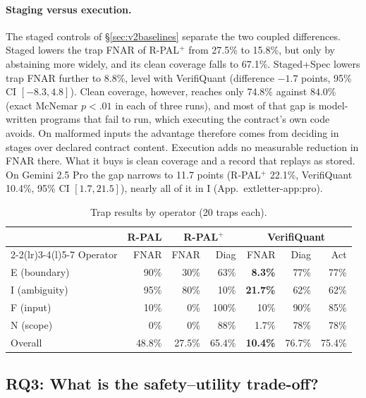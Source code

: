 \documentclass[sigconf]{acmart}
\newcommand{\govVQfnar}{10.4\%}           %
\newcommand{\govPromptFnar}{27.5\%}       %
\newcommand{\govPlainFnar}{48.8\%}        %
\newcommand{\govVQdiag}{76.7\%}
\newcommand{\govVQaction}{75.4\%}
\newcommand{\govPromptDiag}{65.4\%}
\newcommand{\stagedOneFnar}{15.8\%}     %
\newcommand{\stagedTwoFnar}{8.8\%}      %
\newcommand{\stagedOneCov}{67.1\%}     %
\newcommand{\stagedTwoCov}{74.8\%}     %
\newcommand{\proPromptFnar}{22.1\%}     \newcommand{\proVQfnar}{10.4\%}
\newcommand{\proGap}{11.7}  \newcommand{\proCIlo}{1.7}  \newcommand{\proCIhi}{21.5}
\newif\ifarxiv
\newcommand{\extref}[1]{App.~\ifarxiv\ref{#1}\else\csname extletter-#1\endcsname\fi}
\begin{document}
\paragraph{Staging versus execution.}
The staged controls of \S\ref{sec:v2baselines} separate the two coupled differences. Staged lowers the trap FNAR of R-PAL$^{+}$ from \govPromptFnar{} to \stagedOneFnar{}, but only by abstaining more widely, and its clean coverage falls to \stagedOneCov{}. Staged+Spec lowers trap FNAR further to \stagedTwoFnar{}, level with VerifiQuant (difference $-1.7$ points, 95\% CI $[-8.3, 4.8]$). Clean coverage, however, reaches only \stagedTwoCov{} against $84.0\%$ (exact McNemar $p<.01$ in each of three runs), and most of that gap is model-written programs that fail to run, which executing the contract's own code avoids. On malformed inputs the advantage therefore comes from deciding in stages over declared contract content. Execution adds no measurable reduction in FNAR there. What it buys is clean coverage and a record that replays as stored.
On Gemini 2.5 Pro the gap narrows to \proGap{} points (R-PAL$^{+}$ \proPromptFnar{}, VerifiQuant \proVQfnar{}, 95\% CI $[\proCIlo{},\proCIhi{}]$), nearly all of it in I (\extref{app:pro}).
\begin{table}[t]
\caption{Trap results by operator (20 traps each).}
\label{tab:v2trapop}
\small
\setlength{\tabcolsep}{4pt}
\begin{tabular}{@{}lrrrrrr@{}}
\toprule
& R-PAL & \multicolumn{2}{c}{R-PAL$^{+}$} & \multicolumn{3}{c}{VerifiQuant} \\
\cmidrule(lr){2-2}\cmidrule(lr){3-4}\cmidrule(l){5-7}
Operator & FNAR & FNAR & Diag & FNAR & Diag & Act \\
\midrule
E (boundary) & 90\% & 30\% & 63\% & \textbf{8.3\%} & 77\% & 77\% \\
I (ambiguity) & 95\% & 80\% & 10\% & \textbf{21.7\%} & 62\% & 62\% \\
F (input) & 10\% & 0\% & 100\% & 10\% & 90\% & 85\% \\
N (scope) & 0\% & 0\% & 88\% & 1.7\% & 78\% & 78\% \\
\addlinespace
Overall & \govPlainFnar{} & \govPromptFnar{} & \govPromptDiag{} & \textbf{\govVQfnar{}} & \govVQdiag{} & \govVQaction{} \\
\bottomrule
\end{tabular}
\end{table}


\subsection{RQ3: What is the safety--utility trade-off?}\label{sec:v2rq3}
\end{document}
